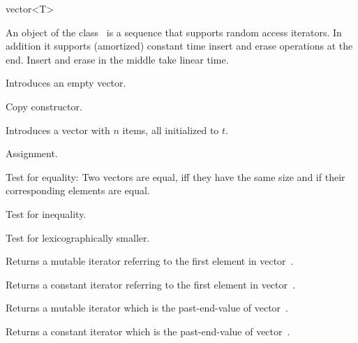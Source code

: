 
\ccHtmlNoClassLinks
\begin{ccClassTemplate} {vector<T>}


\ccDefinition
An object of the class \ccClassName\ is a sequence that supports
random access iterators. In addition it supports (amortized)
constant time insert and erase operations at the end.  Insert and erase 
in the middle take linear time.



\ccTypes
{}



\ccCreation
{}

             {Introduces an empty vector.}

 	    {Copy constructor.}

            {Introduces a vector with $n$ items, all initialized to $t$.}


\ccOperations

        {Assignment.}


       {Test for equality: Two vectors are equal, iff they have the same size
        and if their corresponding elements are equal.}

       {Test for inequality.}

       {Test for lexicographically smaller.}


       {Returns a mutable iterator referring to the first element in
        vector~\ccVar.}

\renewcommand{\ccTagRmTrailingConst}{\ccFalse}
       {Returns a constant iterator referring to the first element in
        vector~\ccVar.}
\renewcommand{\ccTagRmTrailingConst}{\ccTrue}

       {Returns a mutable iterator which is the past-end-value of
        vector~\ccVar.}

\renewcommand{\ccTagRmTrailingConst}{\ccFalse}
       {Returns a constant iterator which is the past-end-value of 
        vector~\ccVar.}
\renewcommand{\ccTagRmTrailingConst}{\ccTrue}


\end{ccClassTemplate}
